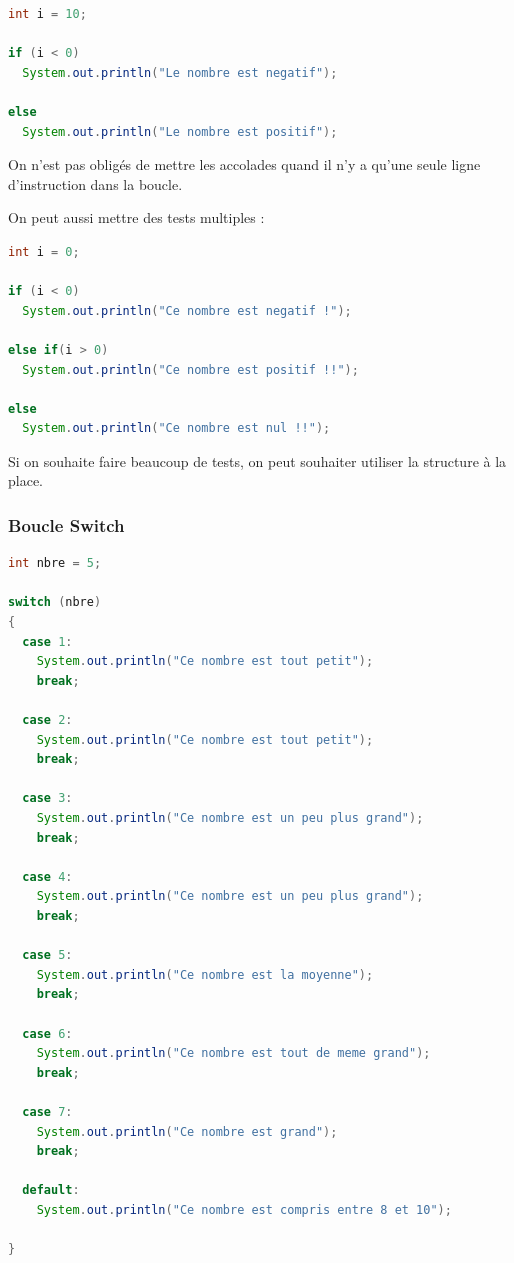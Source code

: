 \documentclass[a4paper,twoside]{article}
\begin{document}
\begin{exemple}
\begin{lstlisting}[language=java]
int i = 10;
 
if (i < 0)
  System.out.println("Le nombre est negatif");
 
else
  System.out.println("Le nombre est positif");
\end{lstlisting}
\end{exemple}

\begin{remarque}
On n'est pas obligés de mettre les accolades quand il n'y a qu'une seule ligne d'instruction dans la boucle.
\end{remarque}

\bigskip

On peut aussi mettre des tests multiples :


\begin{lstlisting}[language=java]
int i = 0;

if (i < 0)
  System.out.println("Ce nombre est negatif !");      

else if(i > 0)
  System.out.println("Ce nombre est positif !!");           

else  
  System.out.println("Ce nombre est nul !!");
\end{lstlisting}

Si on souhaite faire beaucoup de tests, on peut souhaiter utiliser la structure  à la place.

\subsubsection{Boucle Switch}

\begin{lstlisting}[language=java]
int nbre = 5; 

switch (nbre)
{
  case 1: 
    System.out.println("Ce nombre est tout petit");
    break;

  case 2: 
    System.out.println("Ce nombre est tout petit");
    break;

  case 3: 
    System.out.println("Ce nombre est un peu plus grand");
    break;

  case 4: 
    System.out.println("Ce nombre est un peu plus grand");
    break;

  case 5: 
    System.out.println("Ce nombre est la moyenne");
    break;

  case 6: 
    System.out.println("Ce nombre est tout de meme grand");
    break;

  case 7: 
    System.out.println("Ce nombre est grand");
    break;

  default: 
    System.out.println("Ce nombre est compris entre 8 et 10");

}
\end{lstlisting}
\end{document}
